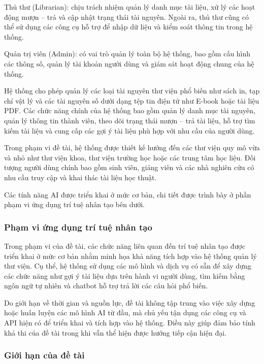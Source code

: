 Thủ thư (Librarian): chịu trách nhiệm quản lý danh mục tài liệu, xử lý các hoạt động mượn – trả và cập nhật trạng thái tài nguyên. Ngoài ra, thủ thư cũng có thể sử dụng các công cụ hỗ trợ để nhập dữ liệu và kiểm soát thông tin trong hệ thống.

Quản trị viên (Admin): có vai trò quản lý toàn bộ hệ thống, bao gồm cấu hình các thông số, quản lý tài khoản người dùng và giám sát hoạt động chung của hệ thống.

Hệ thống cho phép quản lý các loại tài nguyên thư viện phổ biến như sách in, tạp chí vật lý và các tài nguyên số dưới dạng tệp tin điện tử như E-book hoặc tài liệu PDF. Các chức năng chính của hệ thống bao gồm quản lý danh mục tài nguyên, quản lý thông tin thành viên, theo dõi trạng thái mượn – trả tài liệu, hỗ trợ tìm kiếm tài liệu và cung cấp các gợi ý tài liệu phù hợp với nhu cầu của người dùng.

Trong phạm vi đề tài, hệ thống được thiết kế hướng đến các thư viện quy mô vừa và nhỏ như thư viện khoa, thư viện trường học hoặc các trung tâm học liệu. Đối tượng người dùng chính bao gồm sinh viên, giảng viên và các nhà nghiên cứu có nhu cầu truy cập và khai thác tài liệu học thuật.

Các tính năng AI được triển khai ở mức cơ bản, chi tiết được trình bày ở phần phạm vi ứng dụng trí tuệ nhân tạo bên dưới.

\subsubsection{Phạm vi ứng dụng trí tuệ nhân tạo}

Trong phạm vi của đề tài, các chức năng liên quan đến trí tuệ nhân tạo được triển khai ở mức cơ bản nhằm minh họa khả năng tích hợp vào hệ thống quản lý thư viện. Cụ thể, hệ thống sử dụng các mô hình và dịch vụ có sẵn để xây dựng các chức năng như gợi ý tài liệu dựa trên hành vi người dùng, tìm kiếm bằng ngôn ngữ tự nhiên và chatbot hỗ trợ trả lời các câu hỏi phổ biến.

Do giới hạn về thời gian và nguồn lực, đề tài không tập trung vào việc xây dựng hoặc huấn luyện các mô hình AI từ đầu, mà chủ yếu tận dụng các công cụ và API hiện có để triển khai và tích hợp vào hệ thống. Điều này giúp đảm bảo tính khả thi của đề tài trong khi vẫn thể hiện được hướng tiếp cận hiện đại.

\subsubsection{Giới hạn của đề tài}

